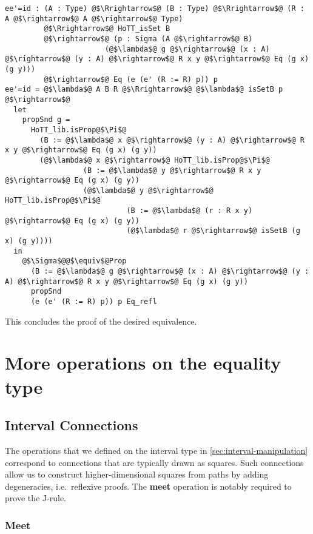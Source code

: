 \documentclass[12pt,twoside,maitrise]{dms}
\theoremstyle{definition}
\numberwithin{equation}{section}
\numberwithin{table}{chapter}
\numberwithin{figure}{chapter}
\begin{document}
\begin{verbatim}
ee'=id : (A : Type) @$\Rrightarrow$@ (B : Type) @$\Rrightarrow$@ (R : A @$\rightarrow$@ A @$\rightarrow$@ Type)
         @$\Rrightarrow$@ HoTT_isSet B
         @$\rightarrow$@ (p : Sigma (A @$\rightarrow$@ B)
                       (@$\lambda$@ g @$\rightarrow$@ (x : A) @$\rightarrow$@ (y : A) @$\rightarrow$@ R x y @$\rightarrow$@ Eq (g x) (g y)))
         @$\rightarrow$@ Eq (e (e' (R := R) p)) p
ee'=id = @$\lambda$@ A B R @$\Rrightarrow$@ @$\lambda$@ isSetB p @$\rightarrow$@
  let
    propSnd g =
      HoTT_lib.isProp@$\Pi$@
        (B := @$\lambda$@ x @$\rightarrow$@ (y : A) @$\rightarrow$@ R x y @$\rightarrow$@ Eq (g x) (g y))
        (@$\lambda$@ x @$\rightarrow$@ HoTT_lib.isProp@$\Pi$@
                  (B := @$\lambda$@ y @$\rightarrow$@ R x y @$\rightarrow$@ Eq (g x) (g y))
                  (@$\lambda$@ y @$\rightarrow$@ HoTT_lib.isProp@$\Pi$@
                            (B := @$\lambda$@ (r : R x y) @$\rightarrow$@ Eq (g x) (g y))
                            (@$\lambda$@ r @$\rightarrow$@ isSetB (g x) (g y))))
  in
    @$\Sigma$@@$\equiv$@Prop
      (B := @$\lambda$@ g @$\rightarrow$@ (x : A) @$\rightarrow$@ (y : A) @$\rightarrow$@ R x y @$\rightarrow$@ Eq (g x) (g y))
      propSnd
      (e (e' (R := R) p)) p Eq_refl
\end{verbatim}

This concludes the proof of the desired equivalence.

\chapter{More operations on the equality type}\label{app:more-eq-ops}

\section*{Interval Connections}\label{sec:interval-connections}

The operations that we defined on the interval type in
\autoref{sec:interval-manipulation} correspond to
connections\cite{cohen2016cubical} that are typically drawn as squares. Such
connections allow us to construct higher-dimensional squares from paths by
adding degeneracies, i.e.\ reflexive proofs. The \textbf{meet} operation is
notably required to prove the J-rule.

\subsection*{Meet}
\end{document}
